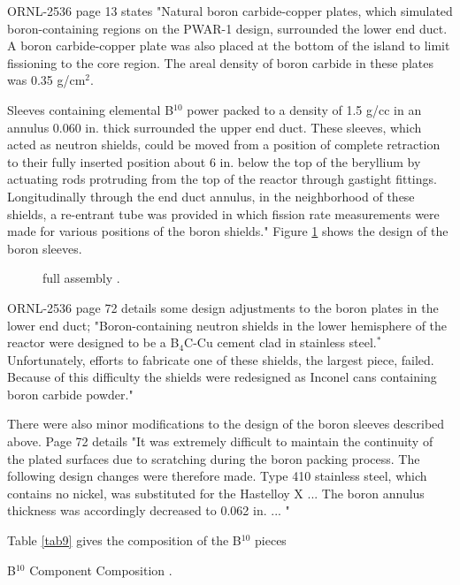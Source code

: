 \documentclass[ms,a4paper]{memoir}
\begin{document}
ORNL-2536 page 13 states "Natural boron carbide-copper plates, which simulated boron-containing regions on the PWAR-1 design, surrounded the lower end duct. A boron carbide-copper plate was also placed at the bottom of the island to limit fissioning to the core region. The areal density of boron carbide in these plates was 0.35 g/cm$^2$.

Sleeves containing elemental B$^{10}$ power packed to a density of 1.5 g/cc in an annulus 0.060 in. thick surrounded the upper end duct. These sleeves, which acted as neutron shields, could be moved from a position of complete retraction to their fully inserted position about 6 in. below the top of the beryllium by actuating rods protruding from the top of the reactor through gastight fittings. Longitudinally through the end duct annulus, in the neighborhood of these shields, a re-entrant tube was provided in which fission rate measurements were made for various positions of the boron shields." Figure \ref{fig8} shows the design of the boron sleeves.

\begin{figure}[H]
  \centering
  \caption{full assembly \parencite[]{ornl-2536}.}
  \label{fig8}
\end{figure}


ORNL-2536 page 72 details some design adjustments to the boron plates in the lower end duct; "Boron-containing neutron shields in the lower hemisphere of the reactor were designed to be a B$_4$C-Cu cement clad in stainless steel.$^*$ Unfortunately, efforts to fabricate one of these shields, the largest piece, failed. Because of this difficulty the shields were redesigned as Inconel cans containing boron carbide powder."

There were also minor modifications to the design of the boron sleeves described above. Page 72 details "It was extremely difficult to maintain the continuity of the plated surfaces due to scratching during the boron packing process. The following design changes were therefore made. Type 410 stainless steel, which contains no nickel, was substituted for the Hastelloy X ... The boron annulus thickness was accordingly decreased to 0.062 in. ... "

Table \ref{tab9} gives the composition of the B$^{10}$ pieces

\begin{table}[H]
  \centering
  \caption{B$^{10}$ Component Composition \parencite[Table 21]{ornl-2536}.}
  \label{tab9}
\end{table}
\end{document}
